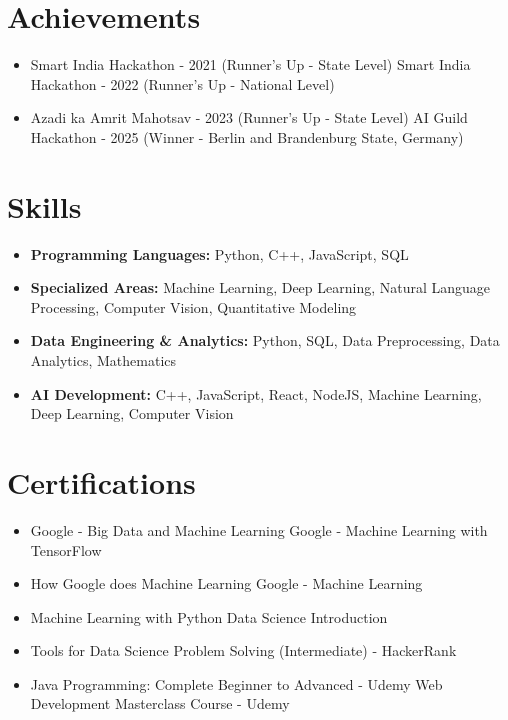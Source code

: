 \documentclass[a4paper,10pt]{article}
\begin{document}
\section*{Achievements}
\begin{itemize}
\item Smart India Hackathon - 2021 (Runner's Up - State Level) \hfill Smart India Hackathon - 2022 (Runner's Up - National Level)
\item Azadi ka Amrit Mahotsav - 2023 (Runner's Up - State Level) \hfill AI Guild Hackathon - 2025 (Winner - Berlin and Brandenburg State, Germany)
\end{itemize}

\section*{Skills}
\begin{itemize}
  \item \textbf{Programming Languages:} Python, C++, JavaScript, SQL
  \item \textbf{Specialized Areas:} Machine Learning, Deep Learning, Natural Language Processing, Computer Vision, Quantitative Modeling
  \item \textbf{Data Engineering \& Analytics:} Python, SQL, Data Preprocessing, Data Analytics, Mathematics
  \item \textbf{AI Development:} C++, JavaScript, React, NodeJS, Machine Learning, Deep Learning, Computer Vision
\end{itemize}

\section*{Certifications}
\begin{itemize}
\item Google - Big Data and Machine Learning \hfill Google - Machine Learning with TensorFlow
\item How Google does Machine Learning \hfill Google - Machine Learning
\item Machine Learning with Python \hfill Data Science Introduction
\item Tools for Data Science \hfill Problem Solving (Intermediate) - HackerRank
\item Java Programming: Complete Beginner to Advanced - Udemy \hfill Web Development Masterclass Course - Udemy
\end{itemize}
\end{document}
